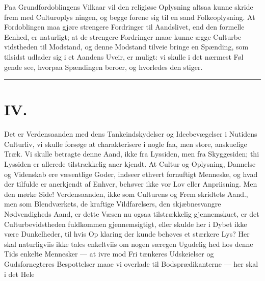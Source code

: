 \documentclass[12pt]{book}
\newcommand{\opage}[1]{\marginnote{\footnotesize\textit{[#1]}}}
\begin{document}
Paa Grundfordoblingens Vilkaar vil den religiøse
Oplysning altsaa kunne skride frem med Culturoplys\-%
ningen, og begge forene sig til en sand Folkeoplysning.
At Fordoblingen maa gjøre strengere Fordringer til
Aandslivet, end den formelle Eenhed, er naturligt; at
de strengere Fordringer maae kunne ægge Culturbe\-%
vidstheden til Modstand, og denne Modstand tilveie\-%
bringe en Spænding, som tilsidst udlader sig i et
Aandens Uveir, er muligt: vi skulle i det nærmest Føl\-%
gende see, hvorpaa Spændingen beroer, og hvorledes
den stiger.

\begin{center}\rule{3cm}{0.4pt}\end{center}

\chapter*{IV.}
\label{ch:iv}
\opage{54}\setcounter{footnote}{0}%
Det er Verdensaanden med dens Tankeindskydelser
og Ideebevægelser i Nutidens Culturliv, vi skulle forsøge
at charakterisere i nogle faa, men store, anskuelige Træk.
Vi skulle betragte denne Aand, ikke fra Lyssiden, men
fra Skyggesiden; thi Lyssiden er allerede tilstrækkelig aner\-%
kjendt. At Cultur og Oplysning, Dannelse og Videnskab
ere væsentlige Goder, indseer ethvert fornuftigt Menneske,
og hvad der tilfulde er anerkjendt af Enhver, behøver
ikke vor Lov eller Anpriisning. Men den mørke
Side! Verdensaanden, ikke som Culturens og Frem\-%
skridtets Aand., %
men som Blendværkets, de kraftige
Vildfarelsers, den skjæbnesvangre Nødvendigheds Aand,
er dette Væsen nu ogsaa tilstrækkelig gjennemskuet, er
det Culturbevidstheden fuldkommen gjennemsigtigt, eller
skulde her i Dybet ikke være Dunkelheder, til hvis Op\-%
klaring der kunde behøves et stærkere Lys? Her skal
naturligviis ikke
tales enkeltviis om nogen særegen Ugudelig\-%
hed hos denne Tids enkelte Mennesker --- at ivre mod Fri\-%
tænkeres Udskeielser og Gudsfornegteres Bespottelser maae
vi overlade til Bodsprædikanterne --- her skal i det Hele
\end{document}
